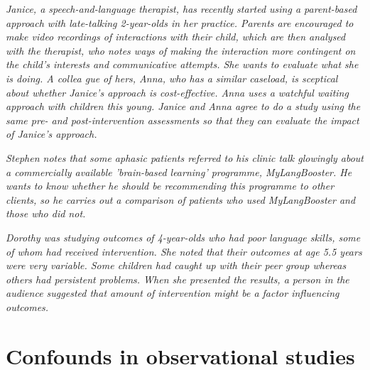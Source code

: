 \documentclass{krantz}
\begin{document}
\begin{shaded}
\textit{Janice, a speech-and-language therapist, has recently started using a parent-based approach with late-talking 2-year-olds in her practice. Parents are encouraged to make video recordings of interactions with their child, which are then analysed with the therapist, who notes ways of making the interaction more contingent on the child's interests and communicative attempts. She wants to evaluate what she is doing. A collea
gue of hers, Anna, who has a similar caseload, is sceptical about whether Janice's approach is cost-effective. Anna uses a watchful waiting approach with children this young. Janice and Anna agree to do a study using the same pre- and post-intervention assessments so that they can evaluate the impact of Janice's approach.}  
\end{shaded}

\begin{shaded}
\textit{Stephen notes that some aphasic patients referred to his clinic talk glowingly about a commercially available 'brain-based learning' programme, MyLangBooster. He wants to know whether he should be recommending this programme to other clients, so he carries out a comparison of patients who used MyLangBooster and those who did not.}
\end{shaded}

\begin{shaded}
\textit{Dorothy was studying outcomes of 4-year-olds who had poor language skills, some of whom had received intervention. She noted that their outcomes at age 5.5 years were very variable. Some children had caught up with their peer group whereas others had persistent problems. When she presented the results, a person in the audience suggested that amount of intervention might be a factor influencing outcomes.}
\end{shaded}

\hypertarget{confounds-in-observational-studies}{%
\section{Confounds in observational studies}\label{confounds-in-observational-studies}}
\end{document}
